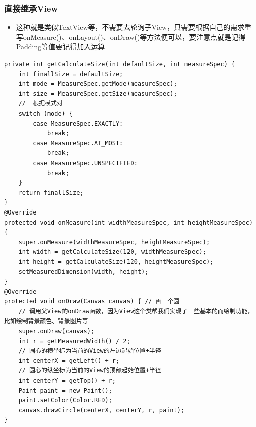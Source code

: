 \documentclass[9pt, b5paper]{article}
\begin{document}
\subsubsection{直接继承View}
\label{sec-1-3-3}
\begin{itemize}
\item 这种就是类似TextView等，不需要去轮询子View，只需要根据自己的需求重写onMeasure()、onLayout()、onDraw()等方法便可以，要注意点就是记得Padding等值要记得加入运算
\end{itemize}
\begin{verbatim}
private int getCalculateSize(int defaultSize, int measureSpec) {
    int finallSize = defaultSize;
    int mode = MeasureSpec.getMode(measureSpec);
    int size = MeasureSpec.getSize(measureSpec);
    //  根据模式对
    switch (mode) {
        case MeasureSpec.EXACTLY: 
            break;
        case MeasureSpec.AT_MOST: 
            break;
        case MeasureSpec.UNSPECIFIED: 
            break;
    }
    return finallSize;
}
@Override
protected void onMeasure(int widthMeasureSpec, int heightMeasureSpec) {
    super.onMeasure(widthMeasureSpec, heightMeasureSpec);
    int width = getCalculateSize(120, widthMeasureSpec);
    int height = getCalculateSize(120, heightMeasureSpec);
    setMeasuredDimension(width, height);
}
@Override
protected void onDraw(Canvas canvas) { // 画一个圆
    // 调用父View的onDraw函数，因为View这个类帮我们实现了一些基本的而绘制功能，比如绘制背景颜色、背景图片等
    super.onDraw(canvas);
    int r = getMeasuredWidth() / 2;
    // 圆心的横坐标为当前的View的左边起始位置+半径
    int centerX = getLeft() + r;
    // 圆心的纵坐标为当前的View的顶部起始位置+半径
    int centerY = getTop() + r;
    Paint paint = new Paint();
    paint.setColor(Color.RED);
    canvas.drawCircle(centerX, centerY, r, paint);
}
\end{verbatim}
\end{document}
